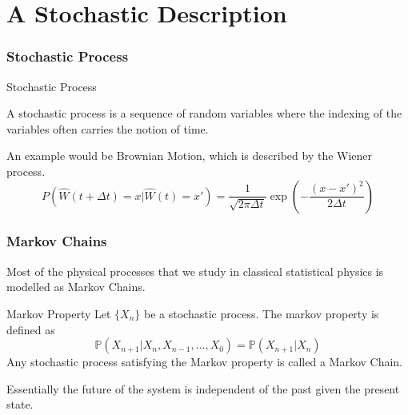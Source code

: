 \documentclass[9pt]{beamer}
\begin{document}
\section{A Stochastic Description}
\begin{frame}
  \frametitle{Stochastic Process}
  \begin{block}{Stochastic Process}

    A stochastic process is a sequence of random variables where the indexing of the variables
    often carries the notion of time. 

  \end{block}

  An example would be Brownian Motion, which is described by the Wiener process.
  \begin{displaymath}
      P(\hat{W}(t+\Delta t)=x | \hat{W}(t)=x') = \frac{1}{\sqrt{2 \pi \Delta t}}\exp(-\frac{(x-x')^2}{2 \Delta t})
    \end{displaymath}

\end{frame}

\begin{frame}
  \frametitle{Markov Chains}
  Most of the physical processes that we study in classical statistical physics is modelled as
  Markov Chains. 
  \begin{block}{Markov Property}
    Let $ \{X_n\}$ be a stochastic process.
    The markov property is defined as
    $$\mathbb{P}(X_{n+1}|X_n,X_{n-1},...,X_0) = \mathbb{P}(X_{n+1}|X_n)$$
    Any stochastic process satisfying the Markov property is called a Markov Chain.
  \end{block}
  Essentially the future of the system is independent of the past given the present state.

\end{frame}
\end{document}
